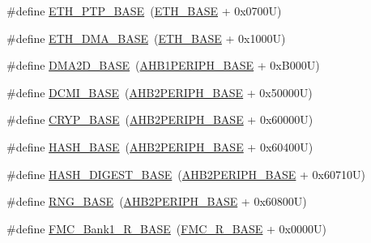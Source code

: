 \begin{DoxyCompactItemize}
\item 
\#define \hyperlink{group___peripheral__memory__map_gaa0f60b922aeb7275c785cbaa8f94ecf0}{E\+T\+H\+\_\+\+P\+T\+P\+\_\+\+B\+A\+SE}~(\hyperlink{group___peripheral__memory__map_gad965a7b1106ece575ed3da10c45c65cc}{E\+T\+H\+\_\+\+B\+A\+SE} + 0x0700\+U)
\item 
\#define \hyperlink{group___peripheral__memory__map_gace2114e1b37c1ba88d60f3e831b67e93}{E\+T\+H\+\_\+\+D\+M\+A\+\_\+\+B\+A\+SE}~(\hyperlink{group___peripheral__memory__map_gad965a7b1106ece575ed3da10c45c65cc}{E\+T\+H\+\_\+\+B\+A\+SE} + 0x1000\+U)
\item 
\#define \hyperlink{group___peripheral__memory__map_gacec66385fd1604e69584eb19a0aaa303}{D\+M\+A2\+D\+\_\+\+B\+A\+SE}~(\hyperlink{group___peripheral__memory__map_ga811a9a4ca17f0a50354a9169541d56c4}{A\+H\+B1\+P\+E\+R\+I\+P\+H\+\_\+\+B\+A\+SE} + 0x\+B000\+U)
\item 
\#define \hyperlink{group___peripheral__memory__map_ga55b794507e021135486de57129a2505c}{D\+C\+M\+I\+\_\+\+B\+A\+SE}~(\hyperlink{group___peripheral__memory__map_gaeedaa71d22a1948492365e2cd26cfd46}{A\+H\+B2\+P\+E\+R\+I\+P\+H\+\_\+\+B\+A\+SE} + 0x50000\+U)
\item 
\#define \hyperlink{group___peripheral__memory__map_ga019f3ad3b3212e56b45984efd8b8efef}{C\+R\+Y\+P\+\_\+\+B\+A\+SE}~(\hyperlink{group___peripheral__memory__map_gaeedaa71d22a1948492365e2cd26cfd46}{A\+H\+B2\+P\+E\+R\+I\+P\+H\+\_\+\+B\+A\+SE} + 0x60000\+U)
\item 
\#define \hyperlink{group___peripheral__memory__map_ga398d121ca28c3f0f90a140b62184e242}{H\+A\+S\+H\+\_\+\+B\+A\+SE}~(\hyperlink{group___peripheral__memory__map_gaeedaa71d22a1948492365e2cd26cfd46}{A\+H\+B2\+P\+E\+R\+I\+P\+H\+\_\+\+B\+A\+SE} + 0x60400\+U)
\item 
\#define \hyperlink{group___peripheral__memory__map_ga41efdf0e6db11dad3003d01882ee8bcb}{H\+A\+S\+H\+\_\+\+D\+I\+G\+E\+S\+T\+\_\+\+B\+A\+SE}~(\hyperlink{group___peripheral__memory__map_gaeedaa71d22a1948492365e2cd26cfd46}{A\+H\+B2\+P\+E\+R\+I\+P\+H\+\_\+\+B\+A\+SE} + 0x60710\+U)
\item 
\#define \hyperlink{group___peripheral__memory__map_gab92662976cfe62457141e5b4f83d541c}{R\+N\+G\+\_\+\+B\+A\+SE}~(\hyperlink{group___peripheral__memory__map_gaeedaa71d22a1948492365e2cd26cfd46}{A\+H\+B2\+P\+E\+R\+I\+P\+H\+\_\+\+B\+A\+SE} + 0x60800\+U)
\item 
\#define \hyperlink{group___peripheral__memory__map_ga1d581e6f64ed2e5d97c11c58285a21b6}{F\+M\+C\+\_\+\+Bank1\+\_\+\+R\+\_\+\+B\+A\+SE}~(\hyperlink{group___peripheral__memory__map_ga7a599164cd92798542bc6288793d1ed5}{F\+M\+C\+\_\+\+R\+\_\+\+B\+A\+SE} + 0x0000\+U)

\end{DoxyCompactItemize}
